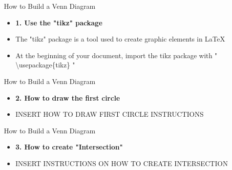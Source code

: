 \documentclass{beamer}
\begin{document}
	\begin{frame}[t,label=frameA]{How to Build a Venn Diagram}
		\begin{itemize}
			\item{\textbf{1. Use the "tikz" package}}
			\item{The "tikz" package is a tool used to create graphic elements in LaTeX}
			\item{At the beginning of your document, import the tikz package with " \textbackslash usepackage\{tikz\} "}
		\end{itemize}
	\end{frame}
	
	\begin{frame}[t,label=frameA]{How to Build a Venn Diagram}
		\begin{itemize}
			\item{\textbf{2. How to draw the first circle}}
			\item{INSERT HOW TO DRAW FIRST CIRCLE INSTRUCTIONS}
		\end{itemize}
	\end{frame}
	
	\begin{frame}[t,label=frameA]{How to Build a Venn Diagram}
		\begin{itemize}
			\item{\textbf{3. How to create "Intersection"}}
			\item{INSERT INSTRUCTIONS ON HOW TO CREATE INTERSECTION}
		\end{itemize}
	\end{frame}
	
\end{document}
